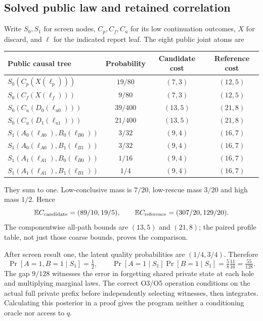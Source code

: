 \documentclass[11pt,a4paper]{article}
\theoremstyle{definition}
\begin{document}
\subsection{Solved public law and retained correlation}
Write $S_0,S_1$ for screen nodes, $C_p,C_f,C_u$ for its low continuation
outcomes, $X$ for discard, and $\ell$ for the indicated report leaf.
The eight public joint atoms are
\begin{center}\small
\begin{tabular}{@{}lccc@{}}
\toprule Public causal tree&Probability&Candidate cost&Reference cost\\\midrule
$S_0(C_p(X(\ell_p)))$&$19/80$&$(7,3)$&$(12,5)$\\
$S_0(C_f(X(\ell_f)))$&$9/80$&$(7,3)$&$(12,5)$\\
$S_0(C_u(D_0(\ell_{u0})))$&$39/400$&$(13,5)$&$(21,8)$\\
$S_0(C_u(D_1(\ell_{u1})))$&$21/400$&$(13,5)$&$(21,8)$\\
$S_1(A_0(\ell_{A0}),B_0(\ell_{B0}))$&$3/32$&$(9,4)$&$(16,7)$\\
$S_1(A_0(\ell_{A0}),B_1(\ell_{B1}))$&$3/32$&$(9,4)$&$(16,7)$\\
$S_1(A_1(\ell_{A1}),B_0(\ell_{B0}))$&$1/16$&$(9,4)$&$(16,7)$\\
$S_1(A_1(\ell_{A1}),B_1(\ell_{B1}))$&$1/4$&$(9,4)$&$(16,7)$\\
\bottomrule
\end{tabular}
\end{center}
They sum to one. Low-conclusive mass is $7/20$, low-rescue mass $3/20$
and high mass $1/2$. Hence
\[
\mathbb E C_{\rm candidate}=(89/10,19/5),\qquad
\mathbb E C_{\rm reference}=(307/20,129/20).
\]
The componentwise all-path bounds are $(13,5)$ and $(21,8)$; the paired
profile table, not just those coarse bounds, proves the comparison.

After screen result one, the latent quality probabilities are
$(1/4,3/4)$. Therefore
\[
\Pr[A=1,B=1\mid S_1]=\tfrac12,
\qquad
\Pr[A=1\mid S_1]\Pr[B=1\mid S_1]
=\tfrac58\tfrac{11}{16}=\tfrac{55}{128}.
\]
The gap $9/128$ witnesses the error in forgetting shared private state
at each hole and multiplying marginal laws. The correct O3/O5 operation
conditions on the actual full private prefix before independently
selecting witnesses, then integrates. Calculating this posterior in a
proof gives the program neither a conditioning oracle nor access to $q$.
\end{document}
